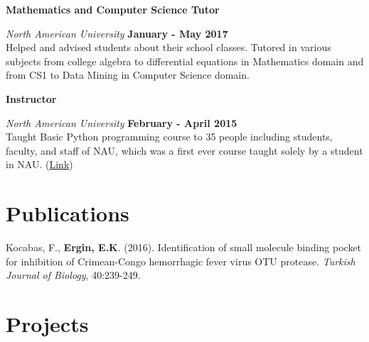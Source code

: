 \documentclass[margin,line]{res}
\begin{document}
\begin{resume}
\vspace{1cm}

{\bf Mathematics and Computer Science Tutor}
\vspace{-.1cm}

{\em North American University} \hfill {\bf January - May 2017}\\
Helped and advised students about their school classes. Tutored in various subjects from college algebra to differential equations in Mathematics domain and from CS1 to Data Mining in Computer Science domain.

{\bf Instructor}
\vspace{-.1cm}

{\em North American University} \hfill {\bf February - April 2015}\\
Taught Basic Python programming course to 35 people including students, faculty, and staff of NAU, which was a first ever course taught solely by a student in NAU. (\href{https://github.com/NAU-Python-Class/Py101-Spring-15}{Link})


\section{\sc Publications}
Kocabas, F., {\bf Ergin, E.K}. (2016). Identification of small molecule binding pocket for inhibition of Crimean-Congo hemorrhagic fever virus OTU protease. {\em Turkish Journal of Biology}, 40:239-249.



%

%



\section{\sc Projects}


\end{resume}
\end{document}
